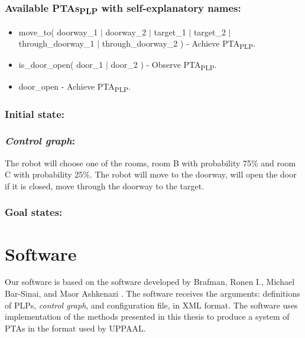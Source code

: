 \subsection{Available PTAs\textsubscript{PLP} with self-explanatory names:}
\begin{itemize}
\item move_to( doorway_1 $\vert$ doorway_2 $\vert$ target_1 $\vert$ target_2 $\vert$ through_doorway_1 $\vert$ through_doorway_2 ) - Achieve PTA\textsubscript{PLP}.
\item is_door_open( door_1 $\vert$ door_2 ) - Observe PTA\textsubscript{PLP}.
\item door_open - Achieve PTA\textsubscript{PLP}.
\end{itemize}
\subsection{Initial state: }
 \clearpage
\subsection{\textit{Control graph}:}
The robot will choose one of the rooms, room B with probability 75\% and room C with probability 25\%. The robot will move to the doorway, will open the door if it is closed, move through the doorway to the target.   \subsection{Goal states: }
 \clearpage
\chapter{Software }
Our software is based on the software developed by Brafman, Ronen I., Michael Bar-Sinai, and Maor Ashkenazi \cite{brafman2016performance}. The software receives the arguments: definitions of PLPs, \textit{control graph}, and configuration file, in XML format. The software uses implementation of the methods presented in this thesis to produce a system of PTAs in the format used by UPPAAL.\\
